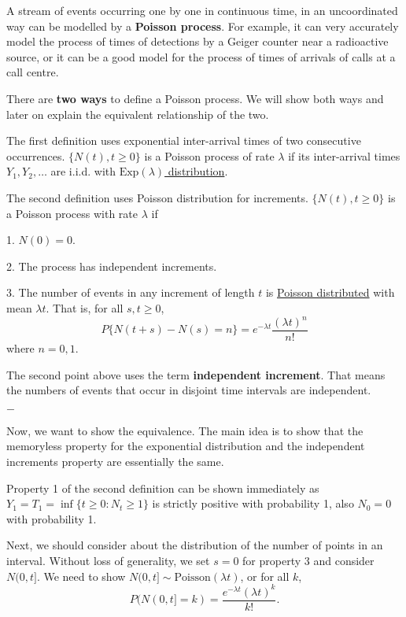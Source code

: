 \documentclass[11pt, a4paper, oneside]{book}
\theoremstyle{definition}
\newcommand{\poisson}[1]{\text{Poisson}(#1)}
\newcommand{\Exp}[1]{\text{Exp}(#1)}
\def\cprocess{\{N(t), t\ge 0\}}
\newcommand{\breaking}{%
    \begin{center}
    $-$
    \end{center}%
}
\begin{document}
\noindent A stream of events occurring one by one in continuous time, in an uncoordinated way can be modelled by a \textbf{Poisson process}. For example, it can very accurately model the process of times of detections by a Geiger counter near a radioactive source, or it can be a good model for the process of times of arrivals of calls at a call centre. 

\noindent There are \textbf{two ways} to define a Poisson process. We will show both ways and later on explain the equivalent relationship of the two. 

\noindent The first definition uses exponential inter-arrival times of two consecutive occurrences. $\cprocess$ is a Poisson process of rate $\lambda$ if its inter-arrival times $Y_1, Y_2, \dots$ are i.i.d. with \underline{$\Exp{\lambda}$ distribution}. 

\noindent The second definition uses Poisson distribution for increments. $\cprocess$ is a Poisson process with rate $\lambda$ if 

1. $N(0) = 0$.

2. The process has independent increments.

3. The number of events in any increment of length $t$ is \underline{Poisson distributed} with mean $\lambda t$. That is, for all $s, t \ge 0$,\[
P\{N(t+s) - N(s) = n\} = e^{-\lambda t}\frac{(\lambda t)^n}{n!}
\]
where $n = 0, 1$.

\noindent The second point above uses the term \textbf{independent increment}. That means the numbers of events that occur in disjoint time intervals are independent. 

\breaking

\noindent Now, we want to show the equivalence. The main idea is to show that the memoryless property for the exponential distribution and the independent increments property are essentially the same. 

\noindent Property 1 of the second definition can be shown immediately as $Y_1 = T_1 = \inf\{t \ge 0: N_t \ge 1\}$ is strictly positive with probability 1, also $N_0 = 0$ with probability 1. 

\noindent Next, we should consider about the distribution of the number of points in an interval. Without loss of generality, we set $s = 0$ for property 3 and consider $N(0,t]$. We need to show $N(0,t] \sim \poisson{\lambda t}$, or for all $k$, \[
P(N(0,t] = k) = \frac{e^{-\lambda t}(\lambda t)^k}{k!}.
\]
\end{document}

